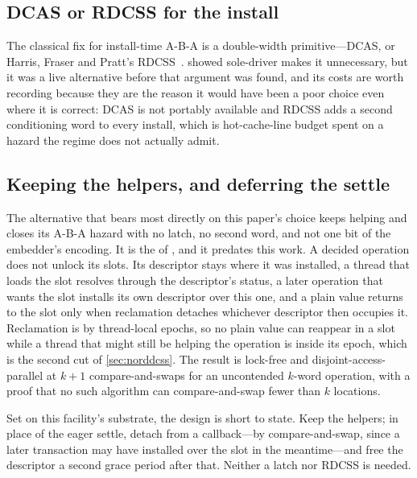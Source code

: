 \documentclass[11pt]{article}
\begin{document}
\subsection{DCAS or RDCSS for the install}
\label{sec:vardcas}

The classical fix for install-time A-B-A is a double-width primitive---DCAS, or
Harris, Fraser and Pratt's RDCSS~\citep{harris2002mcas}. 
showed sole-driver makes it unnecessary, but it was a live alternative before that
argument was found, and its costs are worth recording because they are the reason
it would have been a poor choice even where it is correct: DCAS is not portably
available and RDCSS adds a second conditioning word to every install, which is
hot-cache-line budget spent on a hazard the regime does not actually admit.

\subsection{Keeping the helpers, and deferring the settle}
\label{sec:vardefer}

The alternative that bears most directly on this paper's choice keeps helping
and closes its A-B-A hazard with no latch, no second word, and not one bit of
the embedder's encoding. It is the \kcas of \citet{guerraoui2020mcas}, and it
predates this work. A decided operation does not unlock its slots. Its
descriptor stays where it was installed, a thread that loads the slot resolves
through the descriptor's status, a later operation that wants the slot installs
its own descriptor over this one, and a plain value returns to the slot only
when reclamation detaches whichever descriptor then occupies it. Reclamation is
by thread-local epochs, so no plain value can reappear in a slot while a thread
that might still be helping the operation is inside its epoch, which is the
second cut of \cref{sec:norddcss}. The result is lock-free and
disjoint-access-parallel at $k+1$ compare-and-swaps for an uncontended $k$-word
operation, with a proof that no such algorithm can compare-and-swap fewer than
$k$ locations.

Set on this facility's substrate, the design is short to state. Keep the
helpers; in place of the eager settle, detach from a 
callback---by compare-and-swap, since a later transaction may have installed
over the slot in the meantime---and free the descriptor a second grace period
after that. Neither a latch nor RDCSS is needed.
\end{document}
